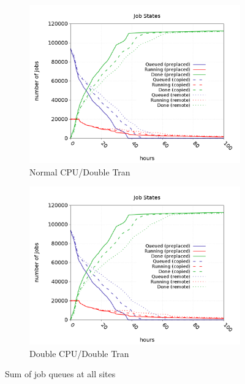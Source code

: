 \documentclass[a4paper]{jpconf}
\begin{document}
\begin{figure}
\begin{subfigure}{0.3\textwidth}
    \includegraphics[width=\textwidth]{figures/FP1_RP0CPU.png}
    \caption{Normal CPU/Double Tran}
  \end{subfigure}
  \begin{subfigure}{0.3\textwidth}
    \includegraphics[width=\textwidth]{figures/FP1_RP1CPU.png}
    \caption{Double CPU/Double Tran}
  \end{subfigure}
  \caption{Sum of job queues at all sites\label{fig:jobQueues}}
\end{figure}
\end{document}
